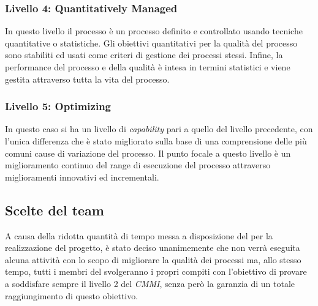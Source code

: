 \subsubsection{Livello 4: Quantitatively Managed}
In questo livello il processo è un processo definito e controllato usando tecniche quantitative o statistiche. Gli obiettivi quantitativi per la qualità del processo sono stabiliti ed usati come criteri di gestione dei processi stessi. Infine, la performance del processo e della qualità è intesa in termini statistici e viene gestita attraverso tutta la vita del processo.

\subsubsection{Livello 5: Optimizing}
In questo caso si ha un livello di \textit{capability} pari a quello del livello precedente, con l'unica differenza che è stato migliorato sulla base di una comprensione delle più comuni cause di variazione del processo. Il punto focale a questo livello è un miglioramento continuo del range di esecuzione del processo attraverso miglioramenti innovativi ed incrementali.

\subsection{Scelte del team}
A causa della ridotta quantità di tempo messa a disposizione del  per la realizzazione del progetto, è stato deciso unanimemente che non verrà eseguita alcuna attività con lo scopo di migliorare la qualità dei processi ma, allo stesso tempo, tutti i membri del  svolgeranno i propri compiti con l'obiettivo di provare a soddisfare sempre il livello 2 del \textit{CMMI}, senza però la garanzia di un totale raggiungimento di questo obiettivo. 

\newpage